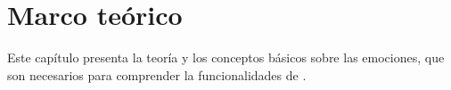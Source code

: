 \chapter{Marco teórico}
\label{section_marco_teorico}
Este capítulo presenta la teoría y los conceptos básicos sobre las emociones, que son necesarios para comprender la funcionalidades de \hcr.
